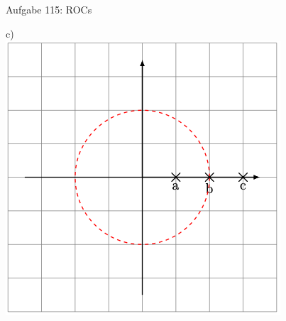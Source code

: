 \documentclass[14pt, aspectratio=169, handout]{beamer}
\begin{document}
\begin{frame}{Aufgabe 115: ROCs}
\begin{minipage}[t]{0.25\textwidth}
\end{minipage}
\hfill
\begin{minipage}[t]{0.25\textwidth}
    c)\\
    \includegraphics[width=\linewidth]{figures/c.png}
\end{minipage}
\end{frame}
\end{document}
